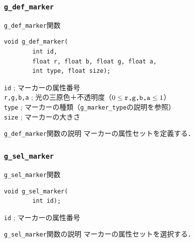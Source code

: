 \documentclass[platex,a4paper,12pt]{jsarticle}%
\begin{document}
\clearpage
\subsubsection{\texttt{g\_def\_marker}}

\begin{itembox}[l]{\texttt{g\_def\_marker}関数}
\begin{verbatim}
void g_def_marker(
        int id,
        float r, float b, float g, float a,
        int type, float size);
\end{verbatim}
\verb|id| ; マーカーの属性番号\\
\verb|r,g,b,a| ; 光の三原色＋不透明度（$0\leq \verb|r,g,b,a| \leq 1$）\\
\verb|type| ; マーカーの種類（\verb|g_marker_type|の説明を参照）\\
\verb|size| ; マーカーの大きさ
\end{itembox}

\begin{itembox}[l]{\texttt{g\_def\_marker}関数の説明}
マーカーの属性セットを定義する．
\end{itembox}

\subsubsection{\texttt{g\_sel\_marker}}

\begin{itembox}[l]{\texttt{g\_sel\_marker}関数}
\begin{verbatim}
void g_sel_marker(
        int id);
\end{verbatim}
\verb|id| ; マーカーの属性番号
\end{itembox}

\begin{itembox}[l]{\texttt{g\_sel\_marker}関数の説明}
マーカーの属性セットを選択する．
\end{itembox}
\end{document}
